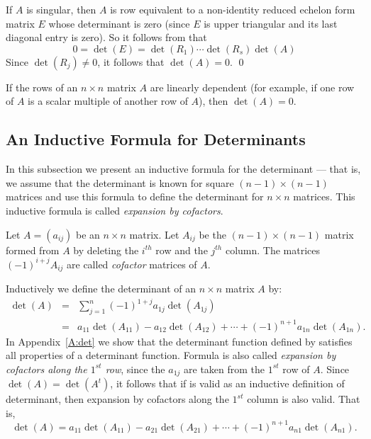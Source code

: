 If $A$ is singular, then $A$ is row equivalent to a non-identity
reduced echelon form matrix $E$ whose determinant is zero (since
$E$ is upper triangular and its last diagonal entry is zero).
So it follows from
 that 
\[
0=\det(E) = \det(R_1)\cdots\det(R_s)\det(A)
\]
Since $\det(R_j)\neq 0$, it follows that $\det(A)=0$.  \qed

\begin{cor}
If the rows of an $n\times n$ matrix $A$ are linearly dependent (for example,
if one row of $A$ is a scalar multiple of another row of $A$), then 
$\det(A)=0$.
\end{cor}


\subsection*{An Inductive Formula for Determinants} 
 
In this subsection we present an inductive formula for the
determinant --- that is, we assume that the determinant is known
for square $(n-1)\times(n-1)$ matrices and use this formula to
define the determinant for $n\times n$ matrices.  This inductive formula
is called {\em expansion by cofactors\/}.
 
Let $A=(a_{ij})$ be an $n\times n$ matrix.  Let $A_{ij}$ be the
$(n-1)\times(n-1)$ matrix formed from $A$ by deleting the
$i^{th}$ row and the $j^{th}$ column.  The matrices $(-1)^{i+j}A_{ij}$ are
called {\em cofactor\/}  matrices of $A$.  

Inductively we define the determinant of an $n\times n$ matrix $A$ by:
\begin{eqnarray}  
\det(A) & = & \sum^n_{j=1} (-1)^{1+j}a_{1j}\det(A_{1j}) \nonumber
\\  & = &
a_{11}\det(A_{11})-a_{12}\det(A_{12})+\cdots+(-1)^{n+1}a_{1n}\det(A_{1n}).
    \label{e:inductdet}
\end{eqnarray} 
In Appendix~\ref{A:det} we show that the determinant function defined by 
 satisfies all properties of a determinant function.
Formula  is also called {\em expansion by cofactors along 
the $1^{st}$ row\/}, since the $a_{1j}$ are taken from the $1^{st}$ row 
of $A$.  Since $\det(A)=\det(A^t)$, it follows that if  is 
valid as an inductive definition of determinant, then expansion by cofactors 
along the $1^{st}$ column is also valid.  That is,
\begin{equation}  \label{e:inductdetc}
\det(A) = 
a_{11}\det(A_{11})-a_{21}\det(A_{21})+\cdots+(-1)^{n+1}a_{n1}\det(A_{n1}).
\end{equation} 

